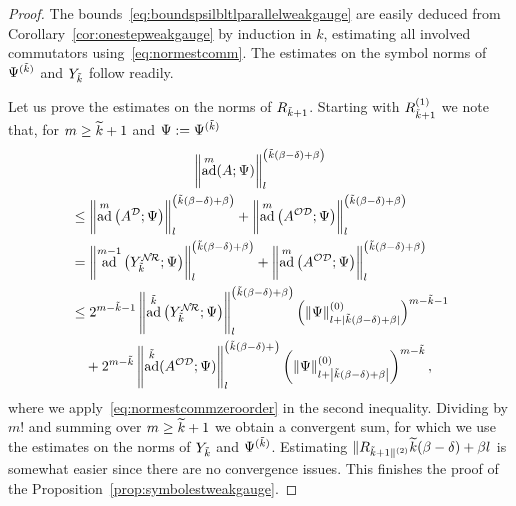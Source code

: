 \documentclass[AHL,Unicode,longabstracts,published]{cedram}
\DeclareMathOperator{\ad}{ad}
\newcommand{\CD}{\mathcal{D}}
\newcommand{\CN}{\mathcal{N}}
\newcommand{\CO}{\mathcal{O}}
\newcommand{\CR}{\mathcal{R}}
\newcommand{\COD}{{\CO\CD}}
\newcommand{\CNR}{{\CN\!\CR}}
\newcommand{\snorm}[3]{\left\| #1\right\|_{#3}^{(#2)}}
\let\oldtilde\tilde
\renewcommand*{\tilde}[1]{\mathchoice{\widetilde{#1}}{\widetilde{#1}}{\oldtilde{#1}}{\oldtilde{#1}}}
\begin{document}
\begin{proof}
The bounds~\eqref{eq:boundspsilbltlparallelweakgauge} are easily deduced from Corollary~\ref{cor:onestepweakgauge} by induction in $k$, estimating all involved commutators using~\eqref{eq:normestcomm}. The estimates on the symbol norms of $\Psi^{(\tilde k)}$ and $Y_{\tilde{k}}$ follow readily.

Let us prove the estimates on the norms of $R_{\tilde{k}+1}$. Starting with $R_{\tilde{k}+1}^{(1)}$ we note that, for $m\geq \tilde{k}+1$ and $\Psi:= \Psi^{(\tilde k)}$
\begin{multline}
\left\|\ad^m(A;\Psi)\right\|^{\left(\tilde{k}(\beta-\delta)+\beta\right)}_l\\
\begin{aligned}
&\leq\left\|\ad^m\left(A^\CD;\Psi\right)\right\|^{\left(\tilde{k}(\beta-\delta) +\beta\right)}_l+\left\|\ad^m\left(A^\COD;\Psi\right)\right\|^{\left(\tilde{k}(\beta-\delta)+\beta\right)}_l\\
&=\left\|\ad^{m-1}\left(Y_{\tilde{k}}^{\CNR};\Psi\right)\right\|^{\left(\tilde{k}(\beta-\delta)+\beta\right)}_l +\left\|\ad^m\left(A^\COD;\Psi\right)\right\|^{\left(\tilde{k}(\beta-\delta)+\beta\right)}_l\\
&\leq 2^{m-\tilde{k}-1}\left\|\ad^{\tilde{k}}\left(Y_{\tilde{k}}^{\CNR};\Psi\right)\right\|^{\left(\tilde{k}(\beta-\delta)+\beta\right)}_l\left(\snorm{\Psi}{0}{l+|\tilde{k}(\beta-\delta)+\beta|}\right)^{m-\tilde{k}-1} \\
& \quad +2^{m-\tilde{k}}\left\|\ad^{\tilde{k}}(A^\COD;\Psi)\right\|^{\left(\tilde{k}(\beta-\delta)+\right)}_l \left(\snorm{\Psi}{0}{l+\left|\tilde{k}(\beta-\delta)+\beta\right|}\right)^{m-\tilde{k}},
\end{aligned}
\end{multline}
where we apply~\eqref{eq:normestcommzeroorder} in the second inequality. Dividing by $m!$ and summing over $m\geq \tilde{k}+1$ we obtain a convergent sum, for which we use the estimates on the norms of $Y_{\tilde{k}}$ and $\Psi^{(\tilde k)}$. Estimating $\|R_{\tilde{k}+1\|^{(2)}}{\tilde{k}(\beta-\delta)+\beta}{l}$ is somewhat easier since there are no convergence issues. This finishes the proof of the Proposition~\ref{prop:symbolestweakgauge}.
\end{proof}
\end{document}
